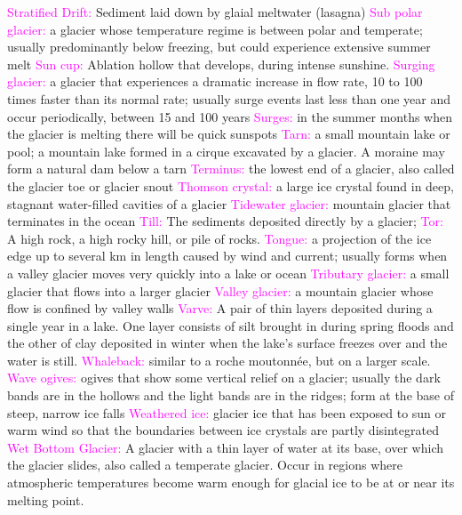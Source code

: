 \documentclass{article}
\newcommand{\pink}[1]{\textcolor{magenta}{#1}}
\newcommand{\vocab}[1]{{\pink{#1}}}
\begin{document}
\begin{multicols*}{4}
		\vocab{Stratified Drift: } Sediment laid down by glaial meltwater (lasagna)  
		\vocab{        Sub polar glacier: } a glacier whose temperature regime is between polar and temperate; usually predominantly below freezing, but could experience extensive summer melt 
		\vocab{Sun cup: }Ablation hollow that develops, during intense sunshine. 
		\vocab{        Surging glacier: } a glacier that experiences a dramatic increase in flow rate, 10 to 100 times faster than its normal rate; usually surge events last less than one year and occur periodically, between 15 and 100 years 
		\vocab{Surges: } in the summer months when the glacier is melting there will be quick sunspots  
		\vocab{        Tarn: } a small mountain lake or pool; a mountain lake formed in a cirque excavated by a glacier. A moraine may form a natural dam below a tarn 
		\vocab{        Terminus: } the lowest end of a glacier, also called the glacier toe or glacier snout 
		\vocab{        Thomson crystal: } a large ice crystal found in deep, stagnant water-filled cavities of a glacier 
		\vocab{        Tidewater glacier: } mountain glacier that terminates in the ocean 
		\vocab{Till: } The sediments deposited directly by a glacier;  
		\vocab{Tor: } A high rock, a high rocky hill, or pile of rocks. 
		\vocab{        Tongue: } a projection of the ice edge up to several km in length caused by wind and current; usually forms when a valley glacier moves very quickly into a lake or ocean
		\vocab{        Tributary glacier: } a small glacier that flows into a larger glacier 
		\vocab{        Valley glacier: } a mountain glacier whose flow is confined by valley walls 
		\vocab{Varve: } A pair of thin layers deposited during a single year in a lake. One layer consists of silt brought in during spring floods and the other of clay deposited in winter when the lake's surface freezes over and the water is still.
		\vocab{Whaleback: } similar to a roche moutonnée, but on a larger scale.
		\vocab{        Wave ogives: } ogives that show some vertical relief on a glacier; usually the dark bands are in the hollows and the light bands are in the ridges; form at the base of steep, narrow ice falls 
		\vocab{        Weathered ice: } glacier ice that has been exposed to sun or warm wind so that the boundaries between ice crystals are partly disintegrated
		\vocab{Wet Bottom Glacier: } A glacier with a thin layer of water at its base, over which the glacier slides, also called a temperate glacier. Occur in regions where atmospheric temperatures become warm enough for glacial ice to be at or near its melting point.  

\end{multicols*}
\end{document}
